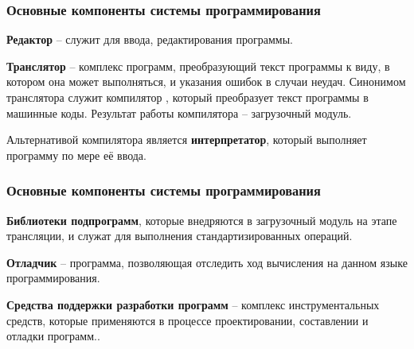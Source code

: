 	\begin{frame}
\frametitle{Основные компоненты системы программирования}


\textbf{Редактор} – служит для ввода, редактирования программы.

\textbf{Транслятор} – комплекс программ, преобразующий текст программы к виду, в котором она может выполняться, и указания ошибок в случаи неудач. Синонимом транслятора служит компилятор , который преобразует текст программы в машинные коды. Результат работы компилятора – загрузочный модуль.

Альтернативой компилятора является \textbf{интерпретатор}, который выполняет программу по мере её ввода.

\end{frame}

	\begin{frame}
\frametitle{Основные компоненты системы программирования}


\textbf{Библиотеки подпрограмм}, которые внедряются в загрузочный модуль на этапе трансляции, и служат для выполнения стандартизированных операций.

\textbf{Отладчик} – программа, позволяющая отследить ход вычисления на данном языке программирования.

\textbf{Средства поддержки разработки программ} – комплекс инструментальных средств, которые применяются в процессе проектировании, составлении и отладки программ..

\end{frame}